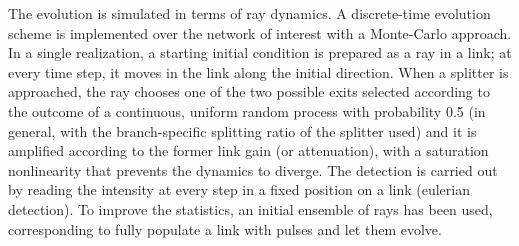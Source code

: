 \documentclass[aps,prl,twocolumn,showpacs,amsmath,amssymb,floatfix,superscriptaddress,
]{revtex4-1}
\begin{document}
The evolution is simulated in terms of ray dynamics. A discrete-time evolution scheme is implemented over the network of interest with a Monte-Carlo approach. In a single realization, a starting initial condition is prepared as a ray in a link; at every time step, it moves in the link along the initial direction. When a splitter is approached, the ray chooses one of the two possible exits selected according to the outcome of a continuous, uniform random process with probability 0.5 (in general, with the branch-specific splitting ratio of the splitter used) and it is amplified according to the former link gain (or attenuation), with a saturation nonlinearity that prevents the dynamics to diverge. The detection is carried out by reading the intensity at every step in a fixed position on a link (eulerian detection). To improve the statistics, an initial ensemble of rays has been used, corresponding to fully populate a link with pulses and let them evolve. 
\end{document}
